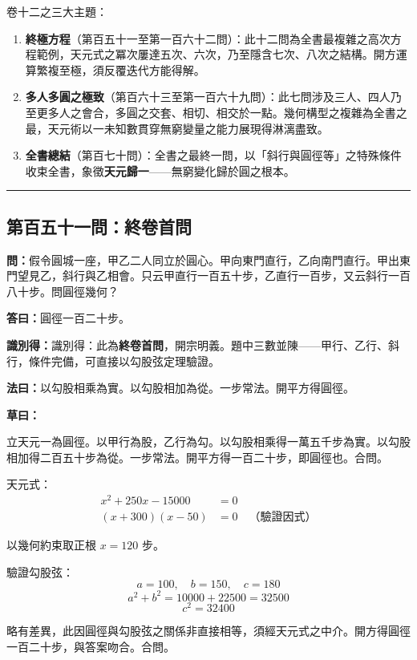 \documentclass[11pt,a4paper]{article}
\newcommand{\longline}{\noindent\rule{\textwidth}{0.4pt}}
\newcommand{\wen}[1]{\par\noindent\textbf{\textcolor{probcolor}{問：}}{#1}\par}
\newcommand{\da}[1]{\par\noindent\textbf{\textcolor{anscolor}{答曰：}}{#1}\par}
\newcommand{\fayue}[1]{\par\noindent\textbf{\textcolor{methodcolor}{法曰：}}{#1}\par}
\newcommand{\caoyue}[1]{\par\noindent\textbf{草曰：}{#1}\par}
\newcommand{\zhi}[1]{\par\noindent\textbf{識別得：}{#1}\par}
\begin{document}
\vspace{0.3cm}

卷十二之三大主題：

\begin{enumerate}[leftmargin=2em]
  \item \textbf{終極方程}（第百五十一至第一百六十二問）：此十二問為全書最複雜之高次方程範例，天元式之冪次屢達五次、六次，乃至隱含七次、八次之結構。開方運算繁複至極，須反覆迭代方能得解。

  \item \textbf{多人多圓之極致}（第百六十三至第一百六十九問）：此七問涉及三人、四人乃至更多人之會合，多圓之交套、相切、相交於一點。幾何構型之複雜為全書之最，天元術以一未知數貫穿無窮變量之能力展現得淋漓盡致。

  \item \textbf{全書總結}（第百七十問）：全書之最終一問，以「斜行與圓徑等」之特殊條件收束全書，象徵\textbf{天元歸一}——無窮變化歸於圓之根本。
\end{enumerate}

\vspace{0.5cm}
\longline

\subsection*{第百五十一問：終卷首問}
\wen{假令圓城一座，甲乙二人同立於圓心。甲向東門直行，乙向南門直行。甲出東門望見乙，斜行與乙相會。只云甲直行一百五十步，乙直行一百步，又云斜行一百八十步。問圓徑幾何？}

\da{圓徑一百二十步。}

\zhi{識別得：此為\textbf{終卷首問}，開宗明義。題中三數並陳——甲行、乙行、斜行，條件完備，可直接以勾股弦定理驗證。}

\fayue{以勾股相乘為實。以勾股相加為從。一步常法。開平方得圓徑。}

\caoyue{
立天元一為圓徑。以甲行為股，乙行為勾。以勾股相乘得一萬五千步為實。以勾股相加得二百五十步為從。一步常法。開平方得一百二十步，即圓徑也。合問。

天元式：
\begin{align*}
x^2 + 250x - 15000 &= 0 \\
(x + 300)(x - 50) &= 0 \quad \text{（驗證因式）}
\end{align*}

以幾何約束取正根 $x = 120$ 步。

驗證勾股弦：
$$a = 100, \quad b = 150, \quad c = 180$$
$$a^2 + b^2 = 10000 + 22500 = 32500$$
$$c^2 = 32400$$

略有差異，此因圓徑與勾股弦之關係非直接相等，須經天元式之中介。開方得圓徑一百二十步，與答案吻合。合問。
}
\end{document}
